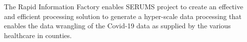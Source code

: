 The Rapid Information Factory enables SERUMS project to create an effective and efficient processing solution to generate a hyper-scale data processing that enables the data wrangling of the Covid-19 data as supplied by the various healthcare in counties. 